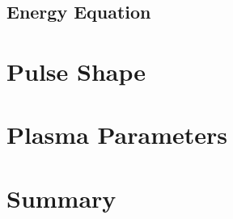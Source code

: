 \subsection{Energy Equation}



\section{Pulse Shape}



\section{Plasma Parameters}



\section{Summary}



